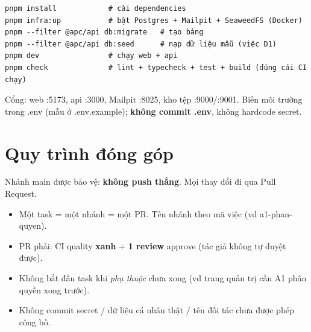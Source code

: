 \documentclass[11pt]{article}
\newcommand{\code}[1]{{\ttfamily #1}}
\begin{document}
\begin{Verbatim}[frame=single,rulecolor=\color{linegray},fontsize=\small]
pnpm install            # cài dependencies
pnpm infra:up           # bật Postgres + Mailpit + SeaweedFS (Docker)
pnpm --filter @apc/api db:migrate   # tạo bảng
pnpm --filter @apc/api db:seed      # nạp dữ liệu mẫu (việc D1)
pnpm dev                # chạy web + api
pnpm check              # lint + typecheck + test + build (đúng cái CI chạy)
\end{Verbatim}

\noindent Cổng: web \code{:5173}, api \code{:3000}, Mailpit \code{:8025}, kho tệp \code{:9000}/\code{:9001}.
Biến môi trường trong \code{.env} (mẫu ở \code{.env.example}); \textbf{không commit \code{.env}}, không hardcode secret.

\section{Quy trình đóng góp}\label{sec:contrib}
Nhánh \code{main} được bảo vệ: \textbf{không push thẳng}. Mọi thay đổi đi qua Pull Request.

\begin{center}
\end{center}

\begin{itemize}
  \item Một task = một nhánh = một PR. Tên nhánh theo mã việc (vd \code{a1-phan-quyen}).
  \item PR phải: CI \code{quality} \textbf{xanh} + \textbf{1 review} approve (tác giả không tự duyệt được).
  \item Không bắt đầu task khi \emph{phụ thuộc} chưa xong (vd trang quản trị cần A1 phân quyền xong trước).
  \item Không commit secret / dữ liệu cá nhân thật / tên đối tác chưa được phép công bố.
\end{itemize}
\end{document}
